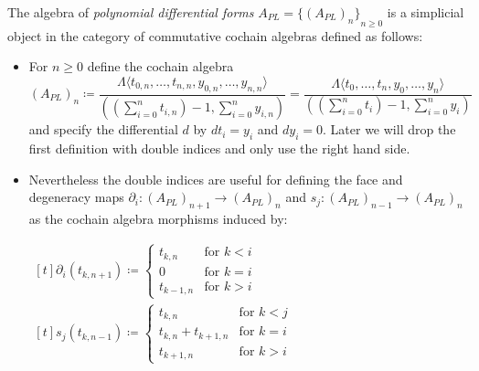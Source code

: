  
 \begin{Definition}
  The algebra of \emph{polynomial differential forms} $A_{PL} = {\lbrace (A_{PL})_n\rbrace}_{n \geq 0}$ is a
  simplicial object in the category of commutative cochain algebras defined as follows: \newline
  \begin{itemize}
   \item For $n \geq 0$ define the cochain algebra 
      $$(A_{PL})_n \coloneqq \frac{\Lambda \langle t_{0,n}, \dotsc, t_{n,n}, y_{0,n}, \dotsc, y_{n,n} \rangle}
      {((\sum_{i = 0}^n t_{i,n}) - 1, \sum_{i = 0}^n y_{i,n})}
      = \frac{\Lambda \langle t_0, \dotsc, t_n, y_0, \dotsc, y_n \rangle}
      {((\sum_{i = 0}^n t_i) - 1, \sum_{i = 0}^n y_i)} $$
      and specify the differential $d$ by $dt_i = y_i$ and $dy_i = 0$. Later we will drop the first definition with
      double indices and only use the right hand side.
   \item Nevertheless the double indices are useful for defining the face and degeneracy maps 
   $ \partial_i \colon (A_{PL})_{n+1} \to (A_{PL})_n$ and $ s_j \colon (A_{PL})_{n-1} \to (A_{PL})_n$
   as the cochain algebra morphisms induced by:
   
    \begin{center}
      \hfill
      $\!\begin{aligned}[t]
       \partial_i (t_{k,n+1}) \coloneqq \begin{cases}
                                      t_{k,n}  	&\text{for $k < i$} \\
                                      0		&\text{for $k = i$}\\
                                      t_{k-1,n} &\text{for $k > i$}
				      \end{cases}
      \end{aligned}$\hfill\hfill
      $\!\begin{aligned}[t]
       s_j (t_{k,n-1}) \coloneqq \begin{cases}
                                      t_{k,n}  			&\text{for $k < j$} \\
                                      t_{k,n} + t_{k+1,n}	&\text{for $k = i$}\\
                                      t_{k+1,n} 		&\text{for $k > i$}
				      \end{cases}
      \end{aligned}$\hfill
    \end{center}    
  \end{itemize}
 \end{Definition}

